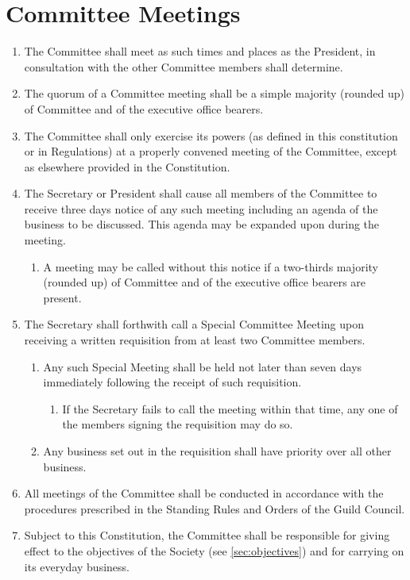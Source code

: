 \documentclass[a4paper]{article}
\begin{document}
\section{Committee Meetings}
\begin{enumerate}
    \item The Committee shall meet as such times and places as the President, in consultation with the other Committee members shall determine.
    \item The quorum of a Committee meeting shall be a simple majority (rounded up) of Committee and of the executive office bearers.
    \item The Committee shall only exercise its powers (as defined in this constitution or in Regulations) at a properly convened meeting of the Committee, except as elsewhere provided in the Constitution.
    \item The Secretary or President shall cause all members of the Committee to receive three days notice of any such meeting including an agenda of the business to be discussed. This agenda may be expanded upon during the meeting.
    \begin{enumerate}
        \item A meeting may be called without this notice if a two-thirds majority (rounded up) of Committee and of the executive office bearers are present.
    \end{enumerate}
    \item The Secretary shall forthwith call a Special Committee Meeting upon receiving a written requisition from at least two Committee members.
    \begin{enumerate}
        \item Any such Special Meeting shall be held not later than seven days immediately following the receipt of such requisition.
        \begin{enumerate}
            \item If the Secretary fails to call the meeting within that time, any one of the members signing the requisition may do so. 
        \end{enumerate}
        \item Any business set out in the requisition shall have priority over all other business.
    \end{enumerate}
    \item All meetings of the Committee shall be conducted in accordance with the procedures prescribed in the Standing Rules and Orders of the Guild Council.
    \item Subject to this Constitution, the Committee shall be responsible for giving effect to the objectives of the Society (see \cref{sec:objectives}) and for carrying on its everyday business.

\end{enumerate}
\end{document}

